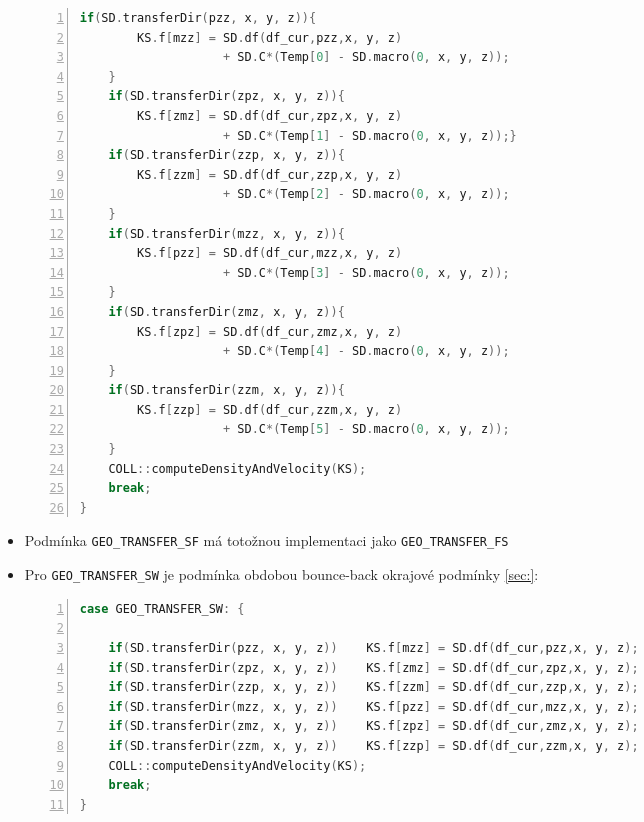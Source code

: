 \begin{itemize}
\begin{lstlisting}[frame=single, backgroundcolor=\color{light-gray}, commentstyle=\color{codegray}, basicstyle=\footnotesize\ttfamily, language=C++, numbers=left, numberstyle=\tiny\color{black}]
    if(SD.transferDir(pzz, x, y, z)){	
        KS.f[mzz] = SD.df(df_cur,pzz,x, y, z) 
                    + SD.C*(Temp[0] - SD.macro(0, x, y, z));
    }
    if(SD.transferDir(zpz, x, y, z)){	
        KS.f[zmz] = SD.df(df_cur,zpz,x, y, z) 
                    + SD.C*(Temp[1] - SD.macro(0, x, y, z));}
    if(SD.transferDir(zzp, x, y, z)){	
        KS.f[zzm] = SD.df(df_cur,zzp,x, y, z) 
                    + SD.C*(Temp[2] - SD.macro(0, x, y, z));
    }
    if(SD.transferDir(mzz, x, y, z)){	
        KS.f[pzz] = SD.df(df_cur,mzz,x, y, z) 
                    + SD.C*(Temp[3] - SD.macro(0, x, y, z));
    }
    if(SD.transferDir(zmz, x, y, z)){	
        KS.f[zpz] = SD.df(df_cur,zmz,x, y, z) 
                    + SD.C*(Temp[4] - SD.macro(0, x, y, z));
    }
    if(SD.transferDir(zzm, x, y, z)){	
        KS.f[zzp] = SD.df(df_cur,zzm,x, y, z) 
                    + SD.C*(Temp[5] - SD.macro(0, x, y, z));
    }
    COLL::computeDensityAndVelocity(KS);
    break;
}	
                \end{lstlisting}
            \item Podm\'{i}nka \texttt{\lstinline{GEO_TRANSFER_SF}} m\'{a} toto\v{z}nou implementaci jako \texttt{\lstinline{GEO_TRANSFER_FS}}
            \item Pro \texttt{\lstinline{GEO_TRANSFER_SW}} je podm\'{i}nka obdobou bounce-back okrajov\'{e} podm\'{i}nky \ref{sec:}:
                \begin{lstlisting}[frame=single, backgroundcolor=\color{light-gray}, commentstyle=\color{codegray}, basicstyle=\footnotesize\ttfamily, language=C++, numbers=left, numberstyle=\tiny\color{black}]
case GEO_TRANSFER_SW: {

    if(SD.transferDir(pzz, x, y, z))	KS.f[mzz] = SD.df(df_cur,pzz,x, y, z);
    if(SD.transferDir(zpz, x, y, z))	KS.f[zmz] = SD.df(df_cur,zpz,x, y, z);
    if(SD.transferDir(zzp, x, y, z))	KS.f[zzm] = SD.df(df_cur,zzp,x, y, z);
    if(SD.transferDir(mzz, x, y, z))	KS.f[pzz] = SD.df(df_cur,mzz,x, y, z);
    if(SD.transferDir(zmz, x, y, z))	KS.f[zpz] = SD.df(df_cur,zmz,x, y, z);
    if(SD.transferDir(zzm, x, y, z))	KS.f[zzp] = SD.df(df_cur,zzm,x, y, z);
    COLL::computeDensityAndVelocity(KS);
    break;
}			    
                \end{lstlisting}
        \end{itemize}

